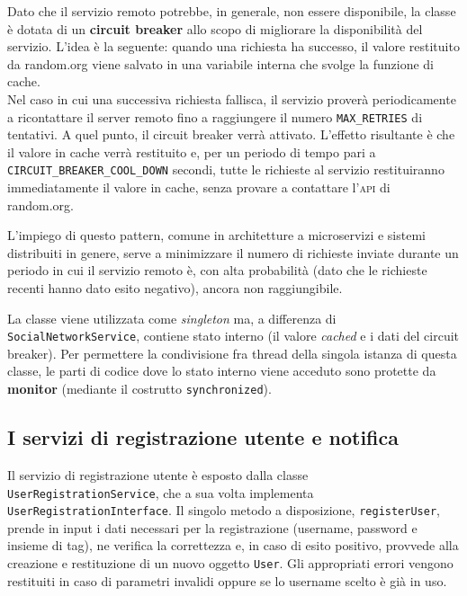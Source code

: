 \documentclass[a4paper,8pt]{article} %
\def\code#1{\texttt{#1}}
\begin{document}
\par Dato che il servizio remoto potrebbe, in generale, non essere disponibile, la classe è dotata di un \textbf{circuit breaker} allo scopo di migliorare la disponibilità del servizio.
L'idea è la seguente: quando una richiesta ha successo, il valore restituito da random.org viene salvato in una variabile interna che svolge la funzione di cache.\\
Nel caso in cui una successiva richiesta fallisca,
il servizio proverà periodicamente a ricontattare il server remoto fino a raggiungere il numero \code{MAX\_RETRIES} di tentativi. A quel punto, il circuit breaker verrà attivato. L'effetto risultante è che il valore in cache verrà
restituito e, per un periodo di tempo pari a \code{CIRCUIT\_BREAKER\_COOL\_DOWN} secondi, tutte le richieste al servizio restituiranno immediatamente il valore in cache, senza provare a contattare l'\textsc{api} di random.org.
\par L'impiego di questo pattern, comune in architetture a microservizi e sistemi distribuiti in genere, serve a minimizzare il numero di richieste inviate durante un periodo in cui il servizio remoto è, con alta probabilità (dato che le richieste recenti hanno dato esito negativo), ancora non raggiungibile.

\par La classe viene utilizzata come \emph{singleton} ma, a differenza di \code{SocialNetworkService}, contiene stato interno (il valore \emph{cached} e i dati del circuit breaker).
Per permettere la condivisione fra thread della singola istanza di questa classe, le parti di codice dove lo stato interno viene acceduto sono protette da \textbf{monitor} (mediante il costrutto \code{synchronized}).

\subsection{I servizi di registrazione utente e notifica}
Il servizio di registrazione utente è esposto dalla classe \code{UserRegistrationService}, che a sua volta implementa \code{UserRegistrationInterface}.
Il singolo metodo a disposizione, \code{registerUser}, prende in input i dati necessari per la registrazione (username, password e insieme di tag), ne verifica la correttezza e,
in caso di esito positivo, provvede alla creazione e restituzione di un nuovo oggetto \code{User}. Gli appropriati errori vengono restituiti in caso di parametri invalidi oppure se lo username
scelto è già in uso.
\end{document}
